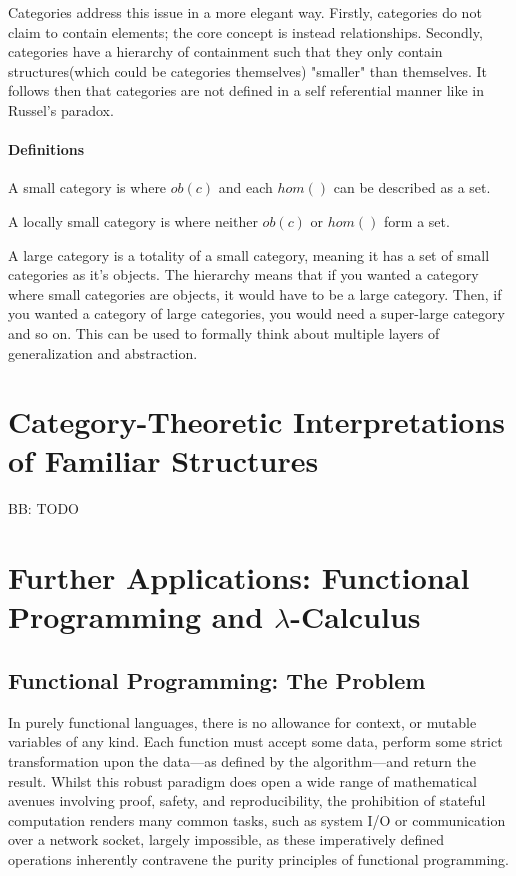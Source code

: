\documentclass[10pt,a4paper]{amsart}
\begin{document}
Categories address this issue in a more elegant way.
Firstly, categories do not claim to contain elements; the core concept is instead relationships.
Secondly, categories have a hierarchy of containment such that they only contain structures(which could be categories themselves) "smaller" than themselves.
It follows then that categories are not defined in a self referential manner like in Russel's paradox.
\paragraph{Definitions}
A small category is where $ob(c)$ and each $hom()$ can be described as a set.

A locally small category is where neither $ob(c)$ or $hom()$ form a set. 

A large category is a totality of a small category, meaning it has a set of small categories as it's objects.
The hierarchy means that if you wanted a category where small categories are objects,
it would have to be a large category.
Then, if you wanted a category of large categories, you would need a super-large category and so on.
This can be used to formally think about multiple layers of generalization and abstraction.
\section{Category-Theoretic %
        Interpretations of Familiar Structures}
BB: TODO

\section{Further Applications: %
        Functional Programming and \texorpdfstring{$\lambda$}{Lambda}-Calculus}
\subsection{Functional Programming: The Problem} In purely functional languages,
there is no allowance for context, or mutable variables of any kind. Each
function must accept some data, perform some strict transformation upon the
data---as defined by the algorithm---and return the result. Whilst this robust
paradigm does open a wide range of mathematical avenues involving proof, safety,
and reproducibility, the prohibition of stateful computation renders many common
tasks, such as system I/O or communication over a network socket, largely
impossible, as these imperatively defined operations inherently contravene the
purity principles of functional programming.
\end{document}
